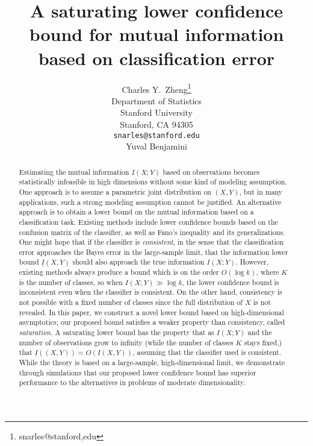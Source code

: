 \documentclass{article}
\title{A saturating lower confidence bound for mutual information based on classification error}
\author{
  Charles Y.~Zheng\thanks{snarles@stanford,edu} \\
  Department of Statistics\\
  Stanford University\\
  Stanford, CA 94305 \\
  \texttt{snarles@stanford.edu} \\
  \And
  Yuval Benjamini \\
}
\begin{document}

\maketitle

\begin{abstract}
Estimating the mutual information $I(X; Y)$ based on observations becomes statistically infeasible in high
dimensions without some kind of modeling assumption.  One approach is to assume a parametric joint distribution on $(X, Y)$, but in many applications, such a strong modeling assumption cannot be justified.
An alternative approach is to obtain a lower bound on the mutual information based on a classification task.
Existing methods include lower confidence bounds based on the confusion matrix of the classifier, as well as
Fano's inequality and its generalizations.  One might hope that if the classifier is \emph{consistent}, in the sense that the classification error approaches the Bayes error in the large-sample limit, that the information lower bound $\underline{I}(X, Y)$ should also approach the true information $I(X; Y)$.  However, existing methods always produce a bound which is on the order $O(\log k)$, where $K$ is the number of classes, so when $I(X; Y) \gg \log k$, the lower confidence bound is inconsistent even when the classifier is consistent.  On the other hand, consistency is not possible with a fixed number of classes since the full distribution of $X$ is not revealed.  In this paper, we construct a novel lower bound based on high-dimensional asymptotics; our proposed bound satisfies a weaker property than consistency, called \emph{saturation.}  A saturating lower bound has the property that as $I(X; Y)$ and the number of observations grow to infinity (while the number of classes $K$ stays fixed,) that $\underline{I}((X, Y)) = O(I(X, Y))$, assuming that the classifier used is consistent. %
While the theory is based on a large-sample, high-dimensional limit, we demonstrate through simulations that our proposed lower confidence bound has superior performance to the alternatives in problems of moderate dimensionality.
\end{abstract}
\end{document}
